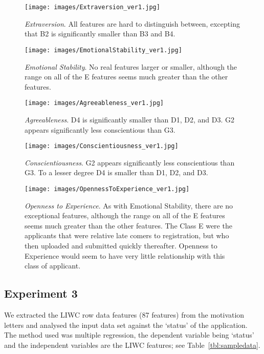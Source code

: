 \documentclass[letterpaper]{article}
\begin{document}
\begin{figure}[!h]
\centering
\texttt{[image: images/Extraversion\_ver1.jpg]}
\caption{{\emph{Extraversion}}. All features are hard to distinguish between, excepting that B2 is
significantly smaller than B3 and B4.}
\label{fig:extraversion}
\end{figure}

\begin{figure}[!h]
\centering
\texttt{[image: images/EmotionalStability\_ver1.jpg]}
\caption{{\emph{Emotional Stability}}. No real features larger or smaller, although the range on all of the E
features seems much greater than the other features.}
\label{fig:emotstab}
\end{figure}

\begin{figure}[!h]
\centering
\texttt{[image: images/Agreeableness\_ver1.jpg]}
\caption{{\emph{Agreeableness}}. D4 is significantly smaller than D1, D2, and D3. G2 appears
significantly less conscientious than G3.}
\label{fig:agreeableness}
\end{figure}

\begin{figure}[!h]
\centering
\texttt{[image: images/Conscientiousness\_ver1.jpg]}
\caption{{\emph{Conscientiousness}}. G2 appears significantly less conscientious than G3. To a lesser
degree D4 is smaller than D1, D2, and D3.}
\label{fig:conscientiousness}
\end{figure}

\begin{figure}[!h]
\centering
\texttt{[image: images/OpennessToExperience\_ver1.jpg]}
\caption{{\emph{Openness to Experience}}. As with Emotional Stability, there are no exceptional features,
although the range on all of the E features seems much greater than
the other features. The Class E were the applicants that were relative
late comers to registration, but who then uploaded and submitted
quickly thereafter. Openness to Experience would seem to have very
little relationship with this class of applicant.}
\label{fig:openexp}
\end{figure}

\subsection{Experiment 3}

We extracted the LIWC row data features (87 features) from the
motivation letters and analysed the input data set against the
`status' of the application. The method used was multiple regression,
the dependent variable being `status' and the independent variables
are the LIWC features; see Table~\ref{tbl:sampledata}.
\end{document}
